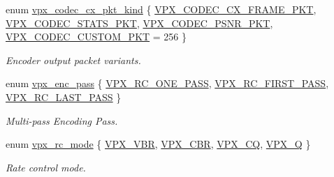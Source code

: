\begin{DoxyCompactItemize}
\item 
enum \hyperlink{group__encoder_ga28a79375279536526552af3a83d2ed72}{vpx\+\_\+codec\+\_\+cx\+\_\+pkt\+\_\+kind} \{ \hyperlink{group__encoder_gga28a79375279536526552af3a83d2ed72a2261aae5594289400e812fb1e6b6b0cc}{V\+P\+X\+\_\+\+C\+O\+D\+E\+C\+\_\+\+C\+X\+\_\+\+F\+R\+A\+M\+E\+\_\+\+P\+K\+T}, 
\hyperlink{group__encoder_gga28a79375279536526552af3a83d2ed72a77cd8b95d9891bcce36117f5f31994fd}{V\+P\+X\+\_\+\+C\+O\+D\+E\+C\+\_\+\+S\+T\+A\+T\+S\+\_\+\+P\+K\+T}, 
\hyperlink{group__encoder_gga28a79375279536526552af3a83d2ed72a11eefa1328e6d22eb7c844645a260628}{V\+P\+X\+\_\+\+C\+O\+D\+E\+C\+\_\+\+P\+S\+N\+R\+\_\+\+P\+K\+T}, 
\hyperlink{group__encoder_gga28a79375279536526552af3a83d2ed72a7b54c122969397b1926de853d28b3c80}{V\+P\+X\+\_\+\+C\+O\+D\+E\+C\+\_\+\+C\+U\+S\+T\+O\+M\+\_\+\+P\+K\+T} = 256
 \}
\begin{DoxyCompactList}\small\item\em Encoder output packet variants. \end{DoxyCompactList}\item 
enum \hyperlink{group__encoder_ga476c5417f9c15a1dc5d3f68fa44c493f}{vpx\+\_\+enc\+\_\+pass} \{ \hyperlink{group__encoder_gga476c5417f9c15a1dc5d3f68fa44c493fa7b6943a41868e8e26a77e9500f139ca1}{V\+P\+X\+\_\+\+R\+C\+\_\+\+O\+N\+E\+\_\+\+P\+A\+S\+S}, 
\hyperlink{group__encoder_gga476c5417f9c15a1dc5d3f68fa44c493faa0765945345b160905f3b762986dae3b}{V\+P\+X\+\_\+\+R\+C\+\_\+\+F\+I\+R\+S\+T\+\_\+\+P\+A\+S\+S}, 
\hyperlink{group__encoder_gga476c5417f9c15a1dc5d3f68fa44c493fa65da543b956d6a9b1f301ab8cc90d3a7}{V\+P\+X\+\_\+\+R\+C\+\_\+\+L\+A\+S\+T\+\_\+\+P\+A\+S\+S}
 \}
\begin{DoxyCompactList}\small\item\em Multi-\/pass Encoding Pass. \end{DoxyCompactList}\item 
enum \hyperlink{group__encoder_gaf50e74d91be4cae6f70dfeba5b7410d2}{vpx\+\_\+rc\+\_\+mode} \{ \hyperlink{group__encoder_ggaf50e74d91be4cae6f70dfeba5b7410d2ab8fbe4441ed3f31a167c8194e8a64f87}{V\+P\+X\+\_\+\+V\+B\+R}, 
\hyperlink{group__encoder_ggaf50e74d91be4cae6f70dfeba5b7410d2a8b02853cb35790d60cc171a11f6c268a}{V\+P\+X\+\_\+\+C\+B\+R}, 
\hyperlink{group__encoder_ggaf50e74d91be4cae6f70dfeba5b7410d2a5f2fd02b55c67d62bfd79380bcb03f63}{V\+P\+X\+\_\+\+C\+Q}, 
\hyperlink{group__encoder_ggaf50e74d91be4cae6f70dfeba5b7410d2a5ebb5564dc5e8ec99d3c6221d89b8858}{V\+P\+X\+\_\+\+Q}
 \}
\begin{DoxyCompactList}\small\item\em Rate control mode. \end{DoxyCompactList}\item 

\end{DoxyCompactItemize}
